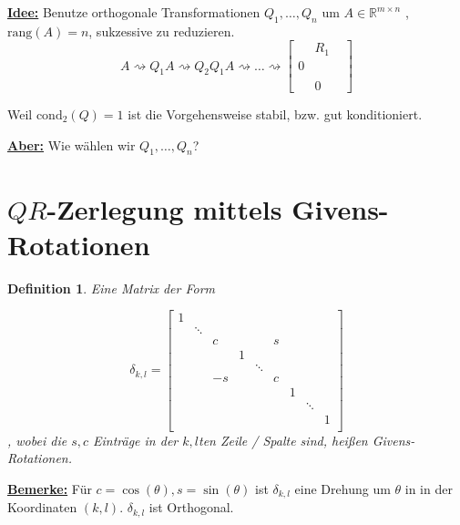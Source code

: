 \documentclass{book}
\newtheorem{definition}[algorithm]{Definition}
\def\R{\mathbb{R}}
\def\rang{\text{rang}}
\def\cond{\text{cond}}
\begin{document}
        \underline{\textbf{Idee:}} Benutze orthogonale Transformationen $Q_1,\dots,Q_n$ um $A\in\R^{m\times n}$ 
        ,$\rang(A)=n$, sukzessive zu reduzieren.
        \[A\rightsquigarrow Q_1A\rightsquigarrow Q_2Q_1 A\rightsquigarrow\dots\rightsquigarrow \begin{bmatrix}
            &R_1\\
            0 &\\
            \\
            & 0 &
        \end{bmatrix}\]

        Weil $\cond_2(Q)=1$ ist die Vorgehensweise stabil, bzw. gut konditioniert.

        \underline{\textbf{Aber:}} Wie wählen wir $Q_1,\dots,Q_n$?

    \section{$QR$-Zerlegung mittels Givens-Rotationen}

        \begin{definition}\label{d2.12}
            Eine Matrix der Form
            
            \[
                \delta_{k,l}=\begin{bmatrix}
                    1 & & & & & & & & \\
                    & \ddots & & & & & & & \\
                    & & c & &  & s & & & \\
                    & & & 1 &  & & & & \\
                    & & & &  \ddots  & & & & \\
                    & & -s & & & c & & & \\
                    & &  & & & & 1 & & \\
                    & &  & & & & & \ddots & \\
                    & &  & & & & &  & 1\\
                \end{bmatrix}
            \]
            , wobei die $s,c$ Einträge in der $k,l$ten Zeile / Spalte sind, heißen Givens-Rotationen.
        \end{definition}

        \underline{\textbf{Bemerke:}} Für $c=\cos(\theta),s=\sin(\theta)$ ist $\delta_{k,l}$ eine Drehung um $\theta$ in 
        in der Koordinaten $(k,l)$. $\delta_{k,l}$ ist Orthogonal.
\end{document}

